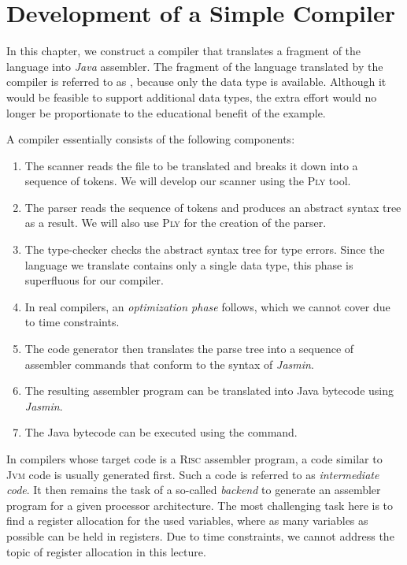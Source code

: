 \chapter{Development of a Simple Compiler}
In this chapter, we construct a compiler that translates a fragment of the  language into \textsl{Java} assembler. The fragment of the  language translated by the compiler is referred to as ,  because only the data type  is available. Although it would be feasible to support additional data types, the extra effort would no longer be proportionate to the educational benefit of the example.

A compiler essentially consists of the following components:
\begin{enumerate}
\item The scanner reads the file to be translated and breaks it down into a sequence of tokens. We will develop our scanner using the \textsc{Ply} tool.
\item The parser reads the sequence of tokens and produces an abstract syntax tree as a result. We will also use \textsc{Ply} for the creation of the parser.
\item The type-checker checks the abstract syntax tree for type errors. Since the language we translate contains only a single data type, this phase is superfluous for our compiler.
\item In real compilers, an \emph{optimization phase} follows, which we cannot cover due to time constraints.
\item The code generator then translates the parse tree into a sequence of assembler commands that conform to the syntax of \textsl{Jasmin}.
\item The resulting assembler program can be translated into Java bytecode using \textsl{Jasmin}.
\item The Java bytecode can be executed using the  command.
\end{enumerate}
In compilers whose target code is a \textsc{Risc} assembler program, a code similar to \textsc{Jvm} code is
usually generated first. Such a code is referred to as \emph{intermediate code}. It then remains the task of a
so-called \emph{backend} to generate an assembler program for a given processor architecture. The most
challenging task here is to find a register allocation for the used variables, where as many variables as
possible can be held in registers. Due to time constraints, we cannot address the topic of register allocation
in this lecture.

